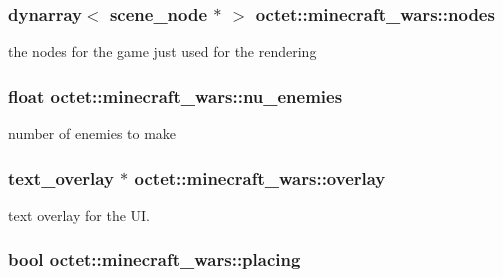 \hypertarget{classoctet_1_1minecraft__wars_a2ef2f751e20910c5fd0bdeca72a9a592}{
\subsubsection[{nodes}]{\setlength{\rightskip}{0pt plus 5cm}dynarray$<$ scene\+\_\+node $\ast$ $>$ octet\+::minecraft\+\_\+wars\+::nodes\hspace{0.3cm}{\ttfamily [private]}}}\label{classoctet_1_1minecraft__wars_a2ef2f751e20910c5fd0bdeca72a9a592}


the nodes for the game just used for the rendering 

\hypertarget{classoctet_1_1minecraft__wars_ac51eb660e901c04fe7d3b7803d32323e}{
\subsubsection[{nu\+\_\+enemies}]{\setlength{\rightskip}{0pt plus 5cm}float octet\+::minecraft\+\_\+wars\+::nu\+\_\+enemies\hspace{0.3cm}{\ttfamily [private]}}}\label{classoctet_1_1minecraft__wars_ac51eb660e901c04fe7d3b7803d32323e}


number of enemies to make 

\hypertarget{classoctet_1_1minecraft__wars_a91905856a8de4b1c973a89790ff17815}{
\subsubsection[{overlay}]{\setlength{\rightskip}{0pt plus 5cm}text\+\_\+overlay $\ast$ octet\+::minecraft\+\_\+wars\+::overlay\hspace{0.3cm}{\ttfamily [private]}}}\label{classoctet_1_1minecraft__wars_a91905856a8de4b1c973a89790ff17815}


text overlay for the U\+I. 

\hypertarget{classoctet_1_1minecraft__wars_ad801da09f504cde20563c2fe46e196e1}{
\subsubsection[{placing}]{\setlength{\rightskip}{0pt plus 5cm}bool octet\+::minecraft\+\_\+wars\+::placing\hspace{0.3cm}{\ttfamily [private]}}}\label{classoctet_1_1minecraft__wars_ad801da09f504cde20563c2fe46e196e1}



